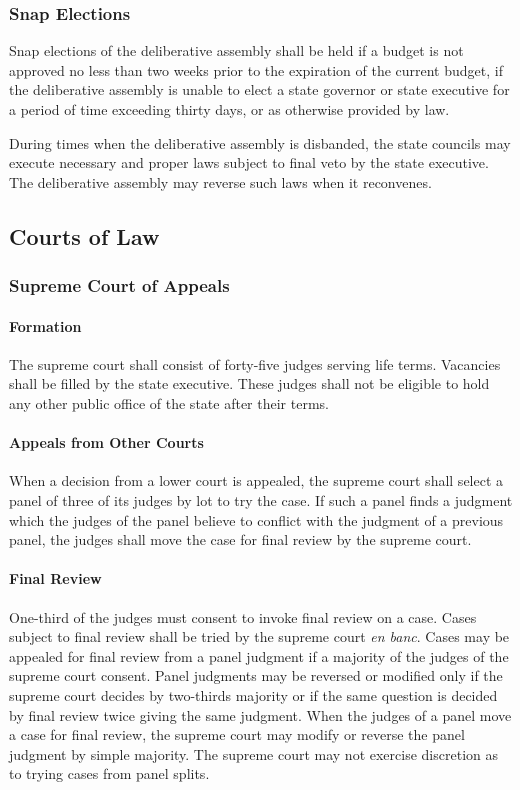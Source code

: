 \documentclass{article}
\begin{document}
\subsubsection{Snap Elections}
Snap elections of the deliberative assembly shall be held if a budget is not approved no less than two weeks prior to the expiration of the current budget, if the deliberative assembly is unable to elect a state governor or state executive for a period of time exceeding thirty days, or as otherwise provided by law.

During times when the deliberative assembly is disbanded, the state councils may execute necessary and proper laws subject to final veto by the state executive. The deliberative assembly may reverse such laws when it reconvenes.
\subsection{Courts of Law}
\subsubsection{Supreme Court of Appeals}
\paragraph{Formation}
The supreme court shall consist of forty-five judges serving life terms. Vacancies shall be filled by the state executive. These judges shall not be eligible to hold any other public office of the state after their terms.
\paragraph{Appeals from Other Courts}
When a decision from a lower court is appealed, the supreme court shall select a panel of three of its judges by lot to try the case. If such a panel finds a judgment which the judges of the panel believe to conflict with the judgment of a previous panel, the judges shall move the case for final review by the supreme court.
\paragraph{Final Review}
One-third of the judges must consent to invoke final review on a case. Cases subject to final review shall be tried by the supreme court \textit{en banc}. Cases may be appealed for final review from a panel judgment if a majority of the judges of the supreme court consent. Panel judgments may be reversed or modified only if the supreme court decides by two-thirds majority or if the same question is decided by final review twice giving the same judgment. When the judges of a panel move a case for final review, the supreme court may modify or reverse the panel judgment by simple majority. The supreme court may not exercise discretion as to trying cases from panel splits.
\end{document}
